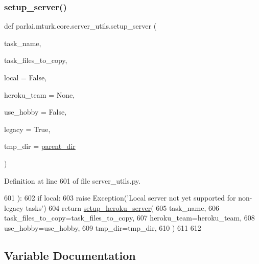 \subsubsection{\texorpdfstring{setup\+\_\+server()}{setup\_server()}}
{\footnotesize\ttfamily def parlai.\+mturk.\+core.\+server\+\_\+utils.\+setup\+\_\+server (\begin{DoxyParamCaption}\item[{}]{task\+\_\+name,  }\item[{}]{task\+\_\+files\+\_\+to\+\_\+copy,  }\item[{}]{local = {\ttfamily False},  }\item[{}]{heroku\+\_\+team = {\ttfamily None},  }\item[{}]{use\+\_\+hobby = {\ttfamily False},  }\item[{}]{legacy = {\ttfamily True},  }\item[{}]{tmp\+\_\+dir = {\ttfamily \hyperlink{namespaceparlai_1_1mturk_1_1core_1_1server__utils_a193439bdbc25a32b00f1a43e6f8532d8}{parent\+\_\+dir}} }\end{DoxyParamCaption})}



Definition at line 601 of file server\+\_\+utils.\+py.


\begin{DoxyCode}
601 ):
602     \textcolor{keywordflow}{if} local:
603         \textcolor{keywordflow}{raise} Exception(\textcolor{stringliteral}{'Local server not yet supported for non-legacy tasks'})
604     \textcolor{keywordflow}{return} \hyperlink{namespaceparlai_1_1mturk_1_1core_1_1server__utils_af1c97e9b93a403e200ac75b87a51c3c1}{setup\_heroku\_server}(
605         task\_name,
606         task\_files\_to\_copy=task\_files\_to\_copy,
607         heroku\_team=heroku\_team,
608         use\_hobby=use\_hobby,
609         tmp\_dir=tmp\_dir,
610     )
611 
612 
\end{DoxyCode}


\subsection{Variable Documentation}
\mbox{\label{namespaceparlai_1_1mturk_1_1core_1_1server__utils_ab10051dadca0c79ca62cc3974302b38c}} 
